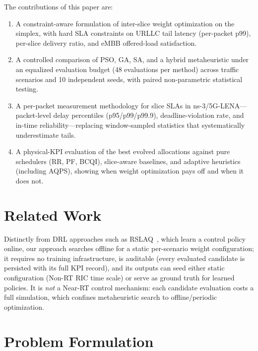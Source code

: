 \documentclass[conference]{IEEEtran}
\newif\ifdraftpending
\newcommand{\pending}[1]{%
  \ifdraftpending{\color{red}\textbf{[PENDING-v2: #1]}}\else{}\fi}
\begin{document}
The contributions of this paper are:
\begin{enumerate}
\item A constraint-aware formulation of inter-slice weight optimization on the
simplex, with hard SLA constraints on URLLC tail latency (per-packet p99),
per-slice delivery ratio, and eMBB offered-load satisfaction.
\item A controlled comparison of PSO, GA, SA, and a hybrid metaheuristic under
an equalized evaluation budget (48 evaluations per method) across \pending{4}
traffic scenarios and 10 independent seeds, with paired non-parametric
statistical testing.
\item A per-packet measurement methodology for slice SLAs in ns-3/5G-LENA---
packet-level delay percentiles (p95/p99/p99.9), deadline-violation rate, and
in-time reliability---replacing window-sampled statistics that systematically
underestimate tails.
\item A physical-KPI evaluation of the best evolved allocations against pure
schedulers (RR, PF, BCQI), slice-aware baselines, and adaptive heuristics
(including AQPS), showing when weight optimization pays off and when it does
not.
\end{enumerate}

\section{Related Work}
\pending{related-work section: RSLAQ (DRL-based SLA control in O-RAN)~\cite{rslaq},
AQPS (QoS-aware priority scheduling)~\cite{aqps}, metaheuristics for RAN
resource allocation, network-slicing surveys. Complete after reference
consolidation.}

Distinctly from DRL approaches such as RSLAQ~\cite{rslaq}, which learn a control
policy online, our approach searches offline for a static per-scenario weight
configuration; it requires no training infrastructure, is auditable (every
evaluated candidate is persisted with its full KPI record), and its outputs can
seed either static configuration (Non-RT RIC time scale) or serve as ground
truth for learned policies. It is \emph{not} a Near-RT control mechanism: each
candidate evaluation costs a full simulation, which confines metaheuristic
search to offline/periodic optimization.

\section{Problem Formulation}
\end{document}
